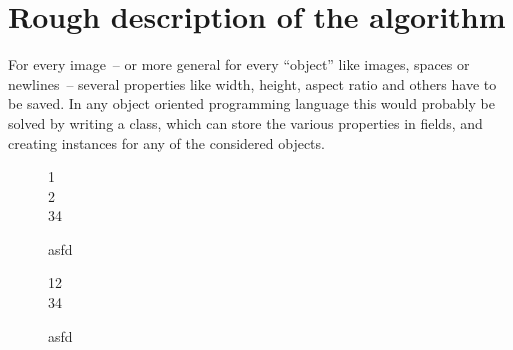 \documentclass[version=3.12,american]{scrartcl}
\begin{document}
\section{Rough description of the algorithm}
For every image~-- or more general for every ``object'' like  images, spaces or newlines~-- several properties like width, height, aspect ratio and others have to be saved. In any object oriented programming language this would probably be solved by writing a class, which can store the various properties in fields, and creating instances for any of the considered objects.

\begin{figure}
\begin{subfiglist}[cs=0pt,ew=200pt,cfw=10pt]{{1\\2\\3}4}
\end{subfiglist}
\caption{asfd}
\end{figure}

\begin{figure}
\begin{subfiglist}[cs=0pt,euh=true,ew=200pt]{12\\34}%
\end{subfiglist}
\caption{asfd}
\end{figure}
\end{document}
